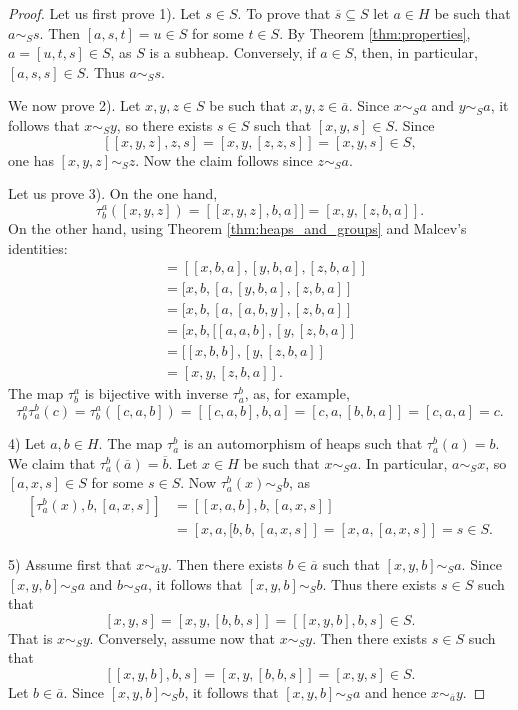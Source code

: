 \documentclass{svmult}
\begin{document}
\begin{proof}
    Let us first prove 1). Let $s\in S$. To prove that 
    $\overline{s}\subseteq S$ let 
    $a\in H$ be such that $a\sim_Ss$. Then 
    $[a,s,t]=u\in S$ for some $t\in S$. By Theorem \ref{thm:properties}, 
    $a=[u,t,s]\in S$, as $S$ is a subheap. Conversely, 
    if $a\in S$, then, in particular, $[a,s,s]\in S$. Thus 
    $a\sim_Ss$. 

    We now prove 2). Let $x,y,z\in S$ be such that $x,y,z\in\overline{a}$. 
    Since $x\sim_Sa$ and $y\sim_Sa$, it follows that 
    $x\sim_Sy$, so there exists $s\in S$ such that $[x,y,s]\in S$.
    Since  
    \[
    [[x,y,z],z,s]=[x,y,[z,z,s]]=[x,y,s]\in S, 
    \]
    one has $[x,y,z]\sim_Sz$. Now the claim follows since 
    $z\sim_Sa$.
    
    Let us prove 3). On the one hand,
    \[
    \tau_b^a([x,y,z])=[[x,y,z],b,a]]=[x,y,[z,b,a]].
    \]
    On the other hand, using Theorem \ref{thm:heaps_and_groups}
    and Malcev's identities:
    \begin{align*}
        [\tau_b^a(x),\tau_b^a(y),\tau_b^a(z)] &= 
        [[x,b,a],[y,b,a],[z,b,a]]\\
        &=[x,b,[a,[y,b,a],[z,b,a]]\\
        &=[x,b,[a,[a,b,y],[z,b,a]]\\
        &=[x,b,[[a,a,b],[y,[z,b,a]]\\
        &=[[x,b,b],[y,[z,b,a]]\\
        &=[x,y,[z,b,a]].
    \end{align*}
    The map $\tau_b^a$ is bijective with inverse $\tau_a^b$, as, 
    for example, 
    \[
    \tau_b^a\tau_a^b(c)
    =\tau_b^a([c,a,b])=[[c,a,b],b,a]=[c,a,[b,b,a]]=[c,a,a]=c.
    \]
    
    4) Let $a,b\in H$. The map $\tau_a^b$ is an automorphism of heaps
    such that $\tau_a^b(a)=b$. We claim that 
    $\tau_a^b(\overline{a})=\overline{b}$. Let $x\in H$ be such that 
    $x\sim_Sa$. In particular, $a\sim_Sx$, so 
    $[a,x,s]\in S$ for some $s\in S$. Now 
    $\tau_a^b(x)\sim_Sb$, as 
    \begin{align*}
    \left[\tau_a^b(x),b,[a,x,s]\right]&=\left[[x,a,b],b,[a,x,s]\right]\\
    &=\left[x,a,[b,b,[a,x,s]\right]
    =\left[x,a,[a,x,s]\right]=s\in S.
    \end{align*}
    
    5) Assume first that $x\sim_{\overline{a}}y$. Then there exists $b\in\overline{a}$ 
    such that $[x,y,b]\sim_Sa$. Since $[x,y,b]\sim_Sa$ and $b\sim_Sa$, it follows
    that $[x,y,b]\sim_Sb$. Thus there exists $s\in S$
    such that 
    \[
    [x,y,s]=[x,y,[b,b,s]]=[[x,y,b],b,s]\in S.
    \]
    That is $x\sim_Sy$. Conversely, assume now that $x\sim_Sy$. Then 
    there exists $s\in S$ such that 
    \[
    [[x,y,b],b,s]=[x,y,[b,b,s]]=[x,y,s]\in S.
    \]
    Let $b\in\overline{a}$. Since $[x,y,b]\sim_Sb$, it follows that 
    $[x,y,b]\sim_Sa$ and hence $x\sim_{\overline{a}}y$. 
\end{proof}
\end{document}
